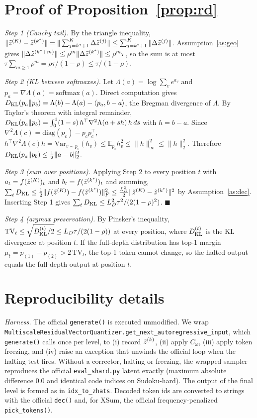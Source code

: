 \section{Proof of Proposition~\ref{prop:rd}}
\label{app:p2}
\textit{Step 1 (Cauchy tail).} By the triangle inequality, $\|\tilde{z}^{(K)}-\tilde{z}^{(k^\ast)}\|=\|\sum_{j=k^\ast+1}^{K}\Delta\tilde{z}^{(j)}\|\le\sum_{j=k^\ast+1}^{K}\|\Delta\tilde{z}^{(j)}\|$. Assumption~\ref{as:geo} gives $\|\Delta\tilde{z}^{(k^\ast+m)}\|\le\rho^m\|\Delta\tilde{z}^{(k^\ast)}\|\le\rho^m\tau$, so the sum is at most $\tau\sum_{m\ge1}\rho^m=\rho\tau/(1-\rho)\le\tau/(1-\rho)$.

\textit{Step 2 (KL between softmaxes).} Let $\Lambda(a)=\log\sum_v e^{a_v}$ and $p_a=\nabla\Lambda(a)=\mathrm{softmax}(a)$. Direct computation gives $D_{\mathrm{KL}}(p_a\|p_b)=\Lambda(b)-\Lambda(a)-\langle p_a,b-a\rangle$, the Bregman divergence of $\Lambda$. By Taylor's theorem with integral remainder, $D_{\mathrm{KL}}(p_a\|p_b)=\int_0^1(1-s)\,h^\top\nabla^2\Lambda(a+sh)\,h\,ds$ with $h=b-a$. Since $\nabla^2\Lambda(c)=\mathrm{diag}(p_c)-p_cp_c^\top$, $h^\top\nabla^2\Lambda(c)h=\mathrm{Var}_{v\sim p_c}(h_v)\le\mathbb{E}_{p_c}h_v^2\le\|h\|_\infty^2\le\|h\|_2^2$. Therefore $D_{\mathrm{KL}}(p_a\|p_b)\le\frac12\|a-b\|_2^2$.

\textit{Step 3 (sum over positions).} Applying Step 2 to every position $t$ with $a_t=f(\tilde{z}^{(K)})_t$ and $b_t=f(\tilde{z}^{(k^\ast)})_t$ and summing, $\sum_tD_{\mathrm{KL}}\le\frac12\|f(\tilde{z}^{(K)})-f(\tilde{z}^{(k^\ast)})\|_F^2\le\frac{L_D^2}{2}\|\tilde{z}^{(K)}-\tilde{z}^{(k^\ast)}\|^2$ by Assumption~\ref{as:dec}. Inserting Step 1 gives $\sum_tD_{\mathrm{KL}}\le L_D^2\tau^2/(2(1-\rho)^2)$. \hfill$\blacksquare$

\textit{Step 4 (argmax preservation).} By Pinsker's inequality, $\mathrm{TV}_t\le\sqrt{D_{\mathrm{KL}}^{(t)}/2}\le L_D\tau/(2(1-\rho))$ at every position, where $D_{\mathrm{KL}}^{(t)}$ is the KL divergence at position $t$. If the full-depth distribution has top-1 margin $\mu_t=p_{(1)}-p_{(2)}>2\,\mathrm{TV}_t$, the top-1 token cannot change, so the halted output equals the full-depth output at position $t$.

\section{Reproducibility details}
\label{app:repro}
\textit{Harness.} The official \texttt{generate()} is executed unmodified. We wrap \texttt{MultiscaleResidualVectorQuantizer.}\allowbreak\texttt{get\_next\_autoregressive\_input}, which \texttt{generate()} calls once per level, to (i) record $\hat{z}^{(k)}$, (ii) apply $C_\omega$, (iii) apply token freezing, and (iv) raise an exception that unwinds the official loop when the halting test fires. Without a corrector, halting or freezing, the wrapped sampler reproduces the official \texttt{eval\_shard.py} latent exactly (maximum absolute difference $0.0$ and identical code indices on Sudoku-hard). The output of the final level is formed as in \texttt{idx\_to\_zhats}. Decoded token ids are converted to strings with the official \texttt{dec()} and, for XSum, the official frequency-penalized \texttt{pick\_tokens()}.

